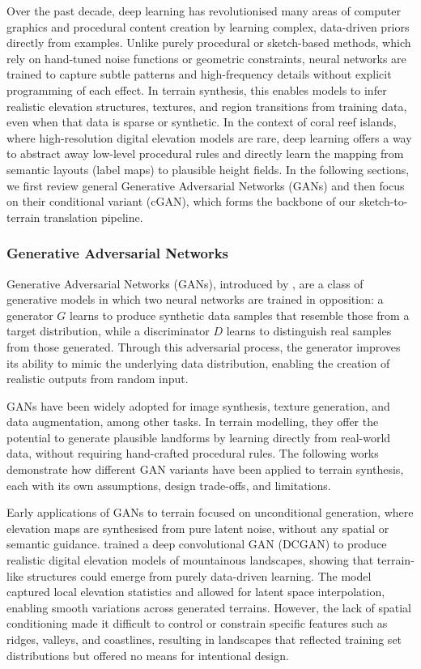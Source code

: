 Over the past decade, deep learning has revolutionised many areas of computer graphics and procedural content creation by learning complex, data-driven priors directly from examples. Unlike purely procedural or sketch-based methods, which rely on hand-tuned noise functions or geometric constraints, neural networks are trained to capture subtle patterns and high-frequency details without explicit programming of each effect. In terrain synthesis, this enables models to infer realistic elevation structures, textures, and region transitions from training data, even when that data is sparse or synthetic. In the context of coral reef islands, where high-resolution digital elevation models are rare, deep learning offers a way to abstract away low-level procedural rules and directly learn the mapping from semantic layouts (label maps) to plausible height fields. In the following sections, we first review general Generative Adversarial Networks (GANs) and then focus on their conditional variant (cGAN), which forms the backbone of our sketch-to-terrain translation pipeline.

\subsubsection{Generative Adversarial Networks}
\label{sec:coral-island-sota-GAN}

Generative Adversarial Networks (GANs), introduced by \cite{Goodfellow2014}, are a class of generative models in which two neural networks are trained in opposition: a generator $G$ learns to produce synthetic data samples that resemble those from a target distribution, while a discriminator $D$ learns to distinguish real samples from those generated. Through this adversarial process, the generator improves its ability to mimic the underlying data distribution, enabling the creation of realistic outputs from random input.

GANs have been widely adopted for image synthesis, texture generation, and data augmentation, among other tasks. In terrain modelling, they offer the potential to generate plausible landforms by learning directly from real-world data, without requiring hand-crafted procedural rules. The following works demonstrate how different GAN variants have been applied to terrain synthesis, each with its own assumptions, design trade-offs, and limitations.

Early applications of GANs to terrain focused on unconditional generation, where elevation maps are synthesised from pure latent noise, without any spatial or semantic guidance. \cite{WulffJensen2018} trained a deep convolutional GAN (DCGAN) to produce realistic digital elevation models of mountainous landscapes, showing that terrain-like structures could emerge from purely data-driven learning. The model captured local elevation statistics and allowed for latent space interpolation, enabling smooth variations across generated terrains. However, the lack of spatial conditioning made it difficult to control or constrain specific features such as ridges, valleys, and coastlines, resulting in landscapes that reflected training set distributions but offered no means for intentional design.

